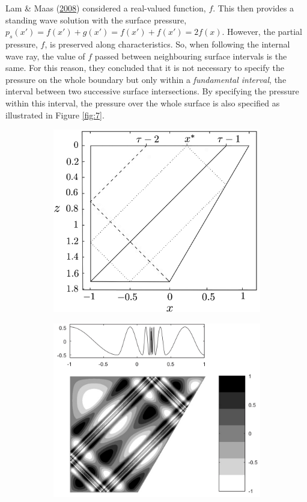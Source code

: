 \documentclass[a4paper]{article}
\numberwithin{equation}{section}
\begin{document}
Lam \& Maas (\hyperlink{ref 18}{2008}) considered a real-valued function, $f$. This then provides a standing wave solution with the surface pressure, $p_s(x') = f(x') + g(x') = f(x') + f(x') = 2f(x)$. However, the partial pressure, $f$, is preserved along characteristics. So, when following the internal wave ray, the value of $f$ passed between neighbouring surface intervals is the same. For this reason, they concluded that it is not necessary to specify the pressure on the whole boundary but only within a \emph{fundamental interval}, the interval between two successive surface intersections. By specifying the pressure within this interval, the pressure over the whole surface is also specified as illustrated in Figure \ref{fig:7}.
\begin{figure}[h!]
\centering
\begin{subfigure}[t]{.5\textwidth}
  \centering
  \includegraphics[width=0.78\linewidth]{Images/drawings}
  \label{fig:sub1}
  \caption{}
\end{subfigure}%
\begin{subfigure}[t]{.5\textwidth}
  \centering
  \includegraphics[width=0.82\linewidth]{Images/internal wave attractor 2.jpeg}

\end{subfigure}
\end{figure}
\end{document}
